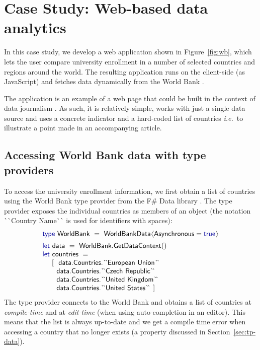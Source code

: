 \documentclass[submission,copyright,creativecommons]{eptcs}
\newcommand{\langl}{\begin{picture}(4.5,7)
\put(1.1,2.5){\rotatebox{60}{\line(1,0){5.5}}}
\put(1.1,2.5){\rotatebox{300}{\line(1,0){5.5}}}
\end{picture}}
\newcommand{\rangl}{\begin{picture}(4.5,7)
\put(.9,2.5){\rotatebox{120}{\line(1,0){5.5}}}
\put(.9,2.5){\rotatebox{240}{\line(1,0){5.5}}}
\end{picture}}
\newcommand{\kvd}[1]{\textnormal{\textcolor{kvdclr}{\sffamily #1}}}
\newcommand{\ident}[1]{\textnormal{\sffamily #1}}
\newcommand{\lident}[1]{\textnormal{\sffamily 
  \`{}\hspace{-0.25em}\`{}\hspace{-0.1em}#1\`{}\hspace{-0.25em}\`{}}}
\begin{document}
\section{Case Study: Web-based data analytics}
\label{sec:case}
In this case study, we develop a web application shown in Figure~\ref{fig:wb}, which lets the
user compare university enrollment in a number of selected countries and regions around the world. 
The resulting application runs on the client-side (as JavaScript) and fetches data dynamically 
from the World Bank \cite{data-wb-schter}.

The application is an example of a web page that could be built in the context of data journalism 
\cite{dj-handbook}. As such, it is relatively simple, works with just a single data source and 
uses a concrete indicator and a hard-coded list of countries \emph{i.e.}~to illustrate a point 
made in an accompanying article.


\subsection{Accessing World Bank data with type providers}

To access the university enrollment information, we first obtain a list of countries using the 
World Bank type provider from the F\# Data library \cite{fsharp-data}. The type provider exposes 
the individual countries as members of an object (the notation \lident{Country Name} is used for 
identifiers with spaces):
%
\begin{equation*}
\begin{array}{l}
 \kvd{type}~\ident{WorldBank}~=~\ident{WorldBankData}\langl\ident{Asynchronous}=\kvd{true}\rangl
 \\[0.5em]
 \kvd{let}~\ident{data}~=~\ident{WorldBank.GetDataContext}() \\
 \kvd{let}~\ident{countries}~= \\
 \quad~\lbrack~~ \ident{data.Countries.}\lident{European Union} \\
 \qquad   \ident{data.Countries.}\lident{Czech Republic} \\
 \qquad   \ident{data.Countries.}\lident{United Kingdom} \\
 \qquad   \ident{data.Countries.}\lident{United States} ~\rbrack 
\end{array}
\end{equation*}
%
The type provider connects to the World Bank and obtains a list of countries at 
\emph{compile-time} and at \emph{edit-time} (when using auto-completion in an editor).
This means that the list is always up-to-date and we get a compile time error when accessing 
a country that no longer exists (a property discussed in Section~\ref{sec:tp-data}).
\end{document}
